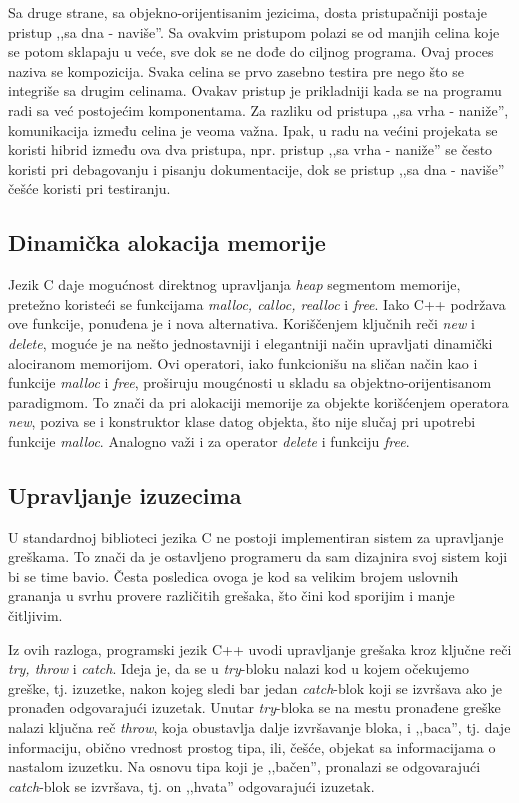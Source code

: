 \documentclass[a4paper]{article}
\begin{document}
{Sa druge strane, sa objekno-orijentisanim jezicima, dosta pristupačniji postaje pristup ,,sa dna - naviše''. Sa ovakvim pristupom polazi se od manjih celina koje se potom sklapaju u veće, sve dok se ne dođe do ciljnog programa. Ovaj proces naziva se kompozicija. Svaka celina se prvo zasebno testira pre nego što se integriše sa drugim celinama. Ovakav pristup je prikladniji kada se na programu radi sa već postojećim komponentama. Za razliku od pristupa ,,sa vrha - naniže'', komunikacija između celina je veoma važna. Ipak, u radu na većini projekata se koristi hibrid između ova dva pristupa, npr. pristup ,,sa vrha - naniže'' se često koristi pri debagovanju i pisanju dokumentacije, dok se pristup ,,sa dna - naviše'' češće koristi pri testiranju.

\subsection{Dinamička alokacija memorije}

Jezik C daje mogućnost direktnog upravljanja \emph{heap} segmentom memorije, pretežno koristeći se funkcijama \emph{malloc, calloc, realloc} i \emph{free}. Iako C++ podržava ove funkcije, ponuđena je i nova alternativa. Koriščenjem ključnih reči \emph{new} i \emph{delete}, moguće je na nešto jednostavniji i elegantniji način upravljati dinamički alociranom memorijom. Ovi operatori, iako funkcionišu na sličan način kao i funkcije \emph{malloc} i \emph{free}, proširuju mougćnosti u skladu sa objektno-orijentisanom paradigmom. To znači da pri alokaciji memorije za objekte korišćenjem operatora \emph{new}, poziva se i konstruktor klase datog objekta, što nije slučaj pri upotrebi funkcije \emph{malloc}. Analogno važi i za operator \emph{delete} i funkciju \emph{free}.


\subsection{Upravljanje izuzecima}

U standardnoj biblioteci jezika C ne postoji implementiran sistem za upravljanje greškama. To znači da je ostavljeno programeru da sam dizajnira svoj sistem koji bi se time bavio. Česta posledica ovoga je kod sa velikim brojem uslovnih grananja u svrhu provere različitih grešaka, što čini kod sporijim i manje čitljivim.

Iz ovih razloga, programski jezik C++ uvodi upravljanje grešaka kroz ključne reči \emph{try, throw} i \emph{catch}. Ideja je, da se u \emph{try}-bloku nalazi kod u kojem očekujemo greške, tj. izuzetke, nakon kojeg sledi bar jedan \emph{catch}-blok koji se izvršava ako je pronađen odgovarajući izuzetak. Unutar \emph{try}-bloka se na mestu pronađene greške nalazi ključna reč \emph{throw}, koja obustavlja dalje izvršavanje bloka, i ,,baca'', tj. daje informaciju, obično vrednost prostog tipa, ili, češće, objekat sa informacijama o nastalom izuzetku. Na osnovu tipa koji je ,,bačen'', pronalazi se odgovarajući \emph{catch}-blok se izvršava, tj. on ,,hvata'' odgovarajući izuzetak.

}
\end{document}
